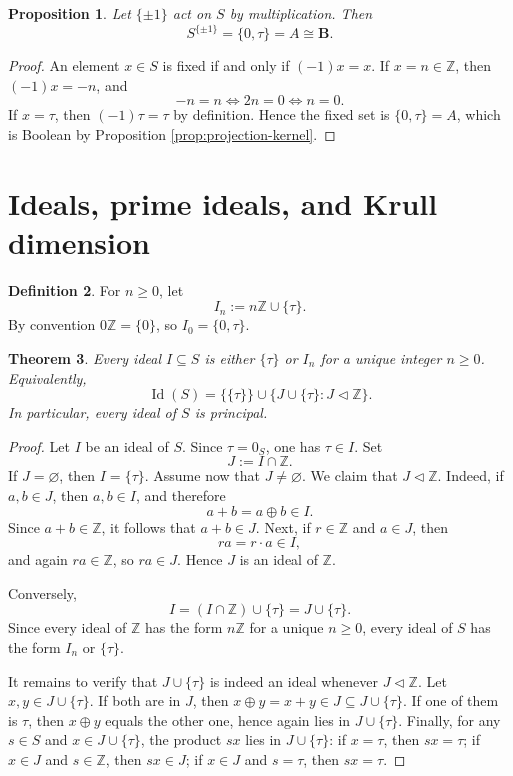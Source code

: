 \documentclass[11pt]{article}
\newtheorem{theorem}{Theorem}[section]
\newtheorem{proposition}[theorem]{Proposition}
\theoremstyle{definition}
\newtheorem{definition}[theorem]{Definition}
\newcommand{\Z}{\mathbb Z}
\newcommand{\B}{\mathbf B}
\newcommand{\Id}{\operatorname{Id}}
\newcommand{\taup}{\tau}
\newcommand{\ideal}[1]{I_{#1}}
\begin{document}
\begin{proposition}\label{prop:fixed-points}
Let \(\{\pm 1\}\) act on \(S\) by multiplication.  Then
\[
S^{\{\pm1\}}=\{0,\taup\}=A\cong \B.
\]
\end{proposition}

\begin{proof}
An element \(x\in S\) is fixed if and only if \((-1)x=x\).  If \(x=n\in\Z\), then \((-1)x=-n\), and
\[
-n=n \iff 2n=0 \iff n=0.
\]
If \(x=\taup\), then \((-1)\taup=\taup\) by definition.  Hence the fixed set is \(\{0,\taup\}=A\), which is Boolean by Proposition \ref{prop:projection-kernel}.
\end{proof}

\section{Ideals, prime ideals, and Krull dimension}

\begin{definition}
For \(n\ge 0\), let
\[
\ideal{n}:=n\Z\cup\{\taup\}.
\]
By convention \(0\Z=\{0\}\), so \(\ideal{0}=\{0,\taup\}\).
\end{definition}

\begin{theorem}\label{thm:ideal-classification}
Every ideal \(I\subseteq S\) is either \(\{\taup\}\) or \(\ideal{n}\) for a unique integer \(n\ge 0\).  Equivalently,
\[
\Id(S)=\bigl\{\{\taup\}\bigr\}\cup\bigl\{J\cup\{\taup\}:J\triangleleft \Z\bigr\}.
\]
In particular, every ideal of \(S\) is principal.
\end{theorem}

\begin{proof}
Let \(I\) be an ideal of \(S\).  Since \(\taup=0_S\), one has \(\taup\in I\).  Set
\[
J:=I\cap \Z.
\]
If \(J=\varnothing\), then \(I=\{\taup\}\).  Assume now that \(J\neq\varnothing\).  We claim that \(J\triangleleft \Z\).  Indeed, if \(a,b\in J\), then \(a,b\in I\), and therefore
\[
a+b=a\oplus b\in I.
\]
Since \(a+b\in \Z\), it follows that \(a+b\in J\).  Next, if \(r\in\Z\) and \(a\in J\), then
\[
ra=r\cdot a\in I,
\]
and again \(ra\in\Z\), so \(ra\in J\).  Hence \(J\) is an ideal of \(\Z\).

Conversely,
\[
I=(I\cap\Z)\cup\{\taup\}=J\cup\{\taup\}.
\]
Since every ideal of \(\Z\) has the form \(n\Z\) for a unique \(n\ge 0\), every ideal of \(S\) has the form \(\ideal{n}\) or \(\{\taup\}\).

It remains to verify that \(J\cup\{\taup\}\) is indeed an ideal whenever \(J\triangleleft \Z\).  Let \(x,y\in J\cup\{\taup\}\).  If both are in \(J\), then \(x\oplus y=x+y\in J\subseteq J\cup\{\taup\}\).  If one of them is \(\taup\), then \(x\oplus y\) equals the other one, hence again lies in \(J\cup\{\taup\}\).  Finally, for any \(s\in S\) and \(x\in J\cup\{\taup\}\), the product \(sx\) lies in \(J\cup\{\taup\}\): if \(x=\taup\), then \(sx=\taup\); if \(x\in J\) and \(s\in\Z\), then \(sx\in J\); if \(x\in J\) and \(s=\taup\), then \(sx=\taup\).
\end{proof}
\end{document}
